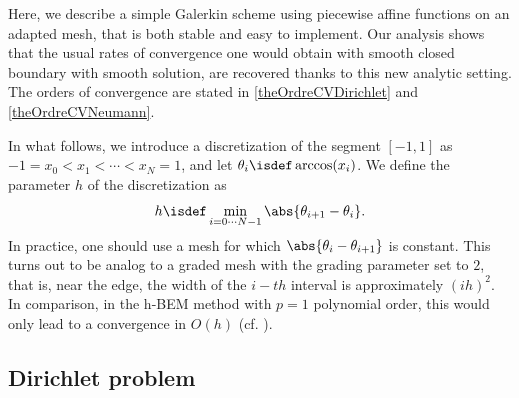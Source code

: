 \documentclass[a4paper]{article}
\begin{document}
	Here, we describe a simple Galerkin scheme using piecewise affine functions on an adapted mesh, that is both stable and easy to implement. Our analysis shows that the usual rates of convergence one would obtain with smooth closed boundary with smooth solution, are recovered thanks to this new analytic setting. The orders of convergence are stated in \autoref{theOrdreCVDirichlet} and \autoref{theOrdreCVNeumann}. 
	
	In what follows, we introduce a discretization of the segment $[-1,1]$ as $-1 = x_0 < x_1 < \cdots < x_N = 1$, and let $\theta_i \isdef \arccos(x_i)$. We define the parameter $h$ of the discretization as 
	\[ h \isdef \min_{i=0\cdots N-1} \abs{\theta_{i+1} - \theta_{i}}.\]
	In practice, one should use a mesh for which $\abs{\theta_i - \theta_{i+1}}$ is constant. This turns out to be analog to a graded mesh with the grading parameter set to $2$, that is, near the edge, the width of the $i-th$ interval is approximately $(ih)^2$. In comparison, in the h-BEM method with $p=1$ polynomial order, this would only lead to a convergence in $O(h)$ (cf. \cite[Theorem 1.3]{postell1990h}).
	
	\subsection{Dirichlet problem}
	
\end{document}
